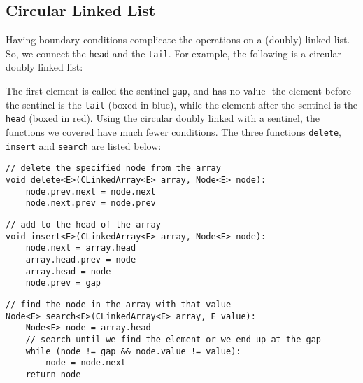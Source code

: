 \documentclass[a4paper, openany]{memoir}
\begin{document}
\subsection{Circular Linked List}
Having boundary conditions complicate the operations on a (doubly) linked list. So, we connect the \texttt{head} and the \texttt{tail}. For example, the following is a circular doubly linked list:
\begin{center}
\end{center}
\noindent The first element is called the sentinel \texttt{gap}, and has no value- the element before the sentinel is the \texttt{tail} (boxed in blue), while the element after the sentinel is the \texttt{head} (boxed in red). Using the circular doubly linked with a sentinel, the functions we covered have much fewer conditions. The three functions \texttt{delete}, \texttt{insert} and \texttt{search} are listed below:
\begin{lstlisting}[language=pseudocode]
// delete the specified node from the array
void delete<E>(CLinkedArray<E> array, Node<E> node):
    node.prev.next = node.next
    node.next.prev = node.prev
\end{lstlisting}
\begin{lstlisting}[language=pseudocode]
// add to the head of the array
void insert<E>(CLinkedArray<E> array, Node<E> node):
    node.next = array.head
    array.head.prev = node
    array.head = node
    node.prev = gap
\end{lstlisting}
\begin{lstlisting}[language=pseudocode]
// find the node in the array with that value
Node<E> search<E>(CLinkedArray<E> array, E value):
    Node<E> node = array.head
    // search until we find the element or we end up at the gap
    while (node != gap && node.value != value):
        node = node.next
    return node
\end{lstlisting}
\newpage
\end{document}
